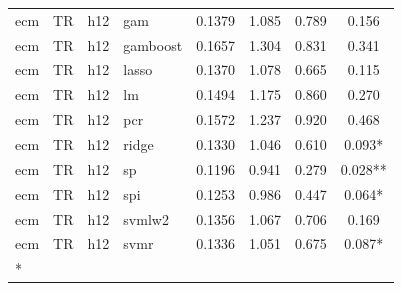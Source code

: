 \begin{ThreePartTable}
\begin{longtable}[t]{llclcccc}
ecm & TR & h12 & gam & 0.1379 & 1.085 & 0.789 & 0.156\\
ecm & TR & h12 & gamboost & 0.1657 & 1.304 & 0.831 & 0.341\\
ecm & TR & h12 & lasso & 0.1370 & 1.078 & 0.665 & 0.115\\
ecm & TR & h12 & lm & 0.1494 & 1.175 & 0.860 & 0.270\\
ecm & TR & h12 & pcr & 0.1572 & 1.237 & 0.920 & 0.468\\
ecm & TR & h12 & ridge & 0.1330 & 1.046 & 0.610 & 0.093*\\
ecm & TR & h12 & sp & 0.1196 & 0.941 & 0.279 & 0.028**\\
ecm & TR & h12 & spi & 0.1253 & 0.986 & 0.447 & 0.064*\\
ecm & TR & h12 & svmlw2 & 0.1356 & 1.067 & 0.706 & 0.169\\
ecm & TR & h12 & svmr & 0.1336 & 1.051 & 0.675 & 0.087*\\*
\end{longtable}
\end{ThreePartTable}
\endgroup{}
